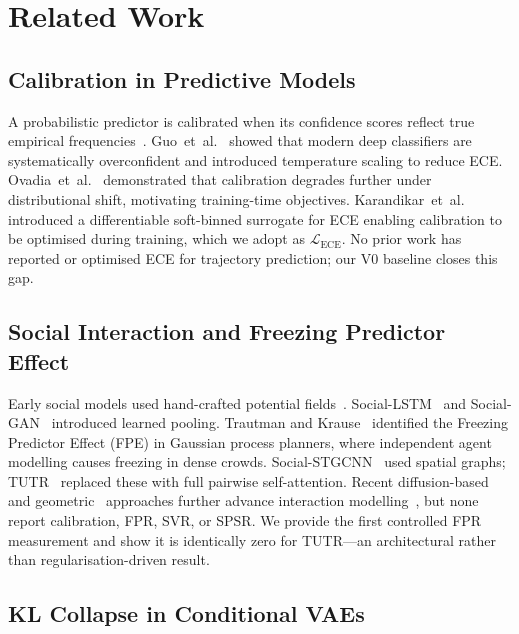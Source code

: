 \documentclass[journal,letterpaper]{IEEEtran}
\makeatletter
\newcommand{\etal}{et~al.\@}
\makeatother
\begin{document}
\section{Related Work}
\label{sec:related}

\subsection{Calibration in Predictive Models}

A probabilistic predictor is calibrated when its confidence scores
reflect true empirical frequencies~\cite{guo2017calibration,niculescu2005predicting}.
Guo~\etal~\cite{guo2017calibration} showed that modern deep classifiers
are systematically overconfident and introduced temperature scaling to
reduce ECE.
Ovadia~\etal~\cite{ovadia2019can} demonstrated that calibration degrades
further under distributional shift, motivating training-time objectives.
Karandikar~\etal~\cite{karandikar2021soft} introduced a differentiable
soft-binned surrogate for ECE enabling calibration to be optimised
during training, which we adopt as \(\mathcal{L}_{\text{ECE}}\).
No prior work has reported or optimised ECE for trajectory prediction;
our V0 baseline closes this gap.

\subsection{Social Interaction and Freezing Predictor Effect}

Early social models used hand-crafted potential
fields~\cite{helbing1995social}.
Social-LSTM~\cite{alahi2016social} and
Social-GAN~\cite{gupta2018social} introduced learned pooling.
Trautman and Krause~\cite{trautman2010unfreezing} identified the
Freezing Predictor Effect (FPE) in Gaussian process planners, where
independent agent modelling causes freezing in dense crowds.
Social-STGCNN~\cite{mohamed2020social} used spatial graphs;
TUTR~\cite{shi2023tutr} replaced these with full pairwise
self-attention.
Recent diffusion-based~\cite{liu2024diftraj} and
geometric~\cite{wong2024socialcircle} approaches further advance
interaction modelling~\cite{bae2024singular}, but none report
calibration, FPR, SVR, or SPSR.
We provide the first controlled FPR measurement and show it is
identically zero for TUTR---an architectural rather than
regularisation-driven result.

\subsection{KL Collapse in Conditional VAEs}
\end{document}
